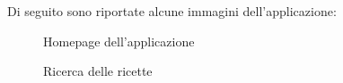 \documentclass[a4paper]{article}
\begin{document}
        Di seguito sono riportate alcune immagini dell'applicazione:
        \begin{figure}[ht]
            \centering
            \caption{Homepage dell'applicazione}
            \label{fig:homepage}
        \end{figure}

        \begin{figure}[ht]
            \centering
            \caption{Ricerca delle ricette}
            \label{fig:search_recipe}
        \end{figure}
\end{document}
